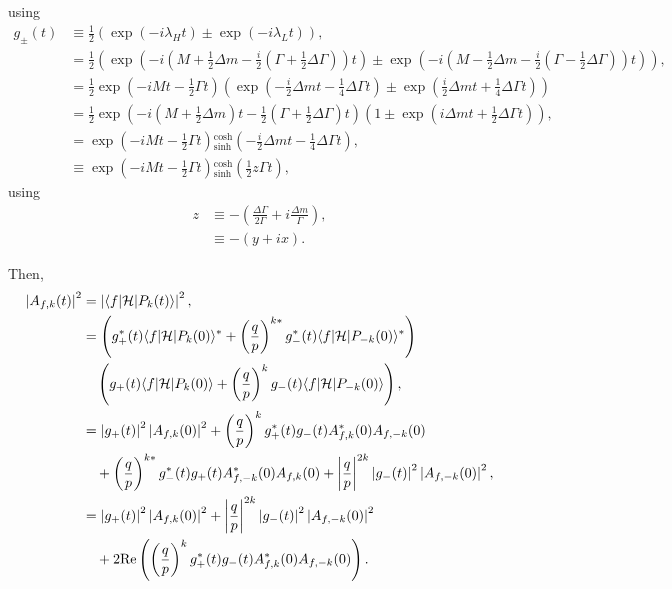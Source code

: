 \documentclass{report}
\def\Deltam{\ensuremath{\Delta m}\xspace}
\def\Deltagamma{\ensuremath{\Delta\Gamma}\xspace}
\def\half{\ensuremath{\frac{1}{2}}\xspace}
\def\PPk{\ensuremath{\PP_k}\xspace}
\def\PPkm{\ensuremath{\PP_{-k}}\xspace}
\newcommand\magsq[1]{\ensuremath{\left|#1\right|^2}\xspace}
\def\hamil{\ensuremath{\mathcal{H}}\xspace}
\begin{document}
using
\begin{align}
  g_\pm(t) &\equiv \half \left(\exp(-i \lambda_H t) \pm \exp(-i \lambda_L t)\right), \\
  &= \half \left( \exp\left(-i \left(M + \half \Deltam - \frac{i}{2} \left(\Gamma + \half\Deltagamma\right)\right) t\right) \pm \exp\left(-i \left(M - \half \Deltam - \frac{i}{2} \left(\Gamma - \half\Deltagamma\right)\right) t\right)\right), \\
  &= \half \exp\left(-i M t - \half \Gamma t \right) \left(\exp\left(-\frac{i}{2} \Deltam t - \frac{1}{4} \Deltagamma t\right) \pm \exp\left(\frac{i}{2} \Deltam t + \frac{1}{4} \Deltagamma t\right)\right) \\
  &= \half \exp\left(-i\left(M + \half \Deltam\right) t - \half\left(\Gamma + \half \Deltagamma\right) t\right) \left(1 \pm \exp\left(i\Deltam t + \half \Deltagamma t\right)\right), \\
  &= \exp\left(-i M t - \half \Gamma t \right) {}^{\cosh}_{\sinh}\left(-\frac{i}{2} \Deltam t - \frac{1}{4} \Deltagamma t\right), \\
  &\equiv \exp\left(-i M t - \half \Gamma t \right) {}^{\cosh}_{\sinh}\left(\half z \Gamma t\right),
\end{align}
using
\begin{align}
  z &\equiv -\left(\frac{\Deltagamma}{2\Gamma} + i \frac{\Deltam}{\Gamma}\right), \\
  &\equiv -(y + i x).
\end{align}
  

Then,
\begin{align}
  \magsq{A_{f,k}(t)} &= \magsq{\bra{f}\hamil\ket{\PPk(t)}},\\
  &= \left(g_+^*(t)\bra{f}\hamil\ket{\PPk(0)}^* + \left(\frac{q}{p}\right)^{k*} g_-^*(t) \bra{f}\hamil\ket{\PPkm(0)}^*\right) \\
    & \quad \left(g_+(t) \bra{f}\hamil\ket{\PPk(0)} + \left(\frac{q}{p}\right)^k g_-(t) \bra{f}\hamil\ket{\PPkm(0)}\right), \\
  &= \magsq{g_+(t)}\magsq{A_{f,k}(0)}  + \left(\frac{q}{p}\right)^k g_+^*(t)g_-(t)A_{f,k}^*(0) A_{f,-k}(0) \\
  &\quad + \left(\frac{q}{p}\right)^{k*} g_-^*(t) g_{+}(t) A_{f,-k}^*(0) A_{f,k}(0) + \left|\frac{q}{p}\right|^{2k} \magsq{g_-(t)}\magsq{A_{f,-k}(0)}, \\
  &= \magsq{g_+(t)} \magsq{A_{f,k}(0)} + \left|\frac{q}{p}\right|^{2k} \magsq{g_-(t)}\magsq{A_{f,-k}(0)} \\
  &\quad + 2 \mathrm{Re}\left(\left(\frac{q}{p}\right)^k g_+^*(t)g_-(t) A_{f,k}^*(0)A_{f,-k}(0) \right).
\end{align}
\end{document}
